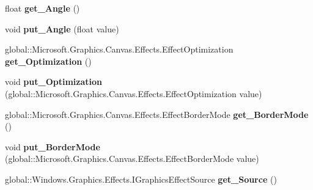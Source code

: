 \begin{DoxyCompactItemize}
float {\bfseries get\+\_\+\+Angle} ()
\item 
\mbox{\label{interface_microsoft_1_1_graphics_1_1_canvas_1_1_effects_1_1_i_directional_blur_effect_a7e8558ed00f4de1768f22d9edc7463be}} 
void {\bfseries put\+\_\+\+Angle} (float value)
\item 
\mbox{\label{interface_microsoft_1_1_graphics_1_1_canvas_1_1_effects_1_1_i_directional_blur_effect_aac219bc783a9db2269f2a420ca5e332c}} 
global\+::\+Microsoft.\+Graphics.\+Canvas.\+Effects.\+Effect\+Optimization {\bfseries get\+\_\+\+Optimization} ()
\item 
\mbox{\label{interface_microsoft_1_1_graphics_1_1_canvas_1_1_effects_1_1_i_directional_blur_effect_af3c7a1c1a75107541138dc590902c805}} 
void {\bfseries put\+\_\+\+Optimization} (global\+::\+Microsoft.\+Graphics.\+Canvas.\+Effects.\+Effect\+Optimization value)
\item 
\mbox{\label{interface_microsoft_1_1_graphics_1_1_canvas_1_1_effects_1_1_i_directional_blur_effect_a74efbf96cb636f056a89880c63859cd8}} 
global\+::\+Microsoft.\+Graphics.\+Canvas.\+Effects.\+Effect\+Border\+Mode {\bfseries get\+\_\+\+Border\+Mode} ()
\item 
\mbox{\label{interface_microsoft_1_1_graphics_1_1_canvas_1_1_effects_1_1_i_directional_blur_effect_a826a5452cf6d53f023b716ce8307b270}} 
void {\bfseries put\+\_\+\+Border\+Mode} (global\+::\+Microsoft.\+Graphics.\+Canvas.\+Effects.\+Effect\+Border\+Mode value)
\item 
\mbox{\label{interface_microsoft_1_1_graphics_1_1_canvas_1_1_effects_1_1_i_directional_blur_effect_a4bd130580cbba798a3932118c6be8047}} 
global\+::\+Windows.\+Graphics.\+Effects.\+I\+Graphics\+Effect\+Source {\bfseries get\+\_\+\+Source} ()
\item 

\end{DoxyCompactItemize}
